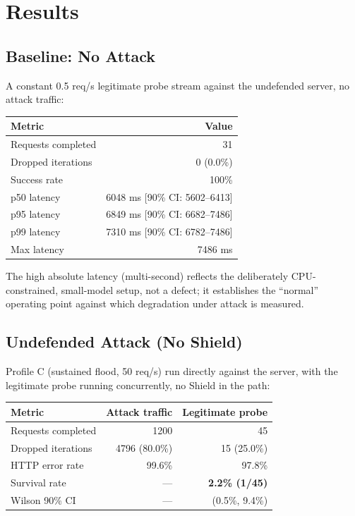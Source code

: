 \documentclass[11pt]{article}
\begin{document}
\section{Results}

\subsection{Baseline: No Attack}

A constant 0.5 req/s legitimate probe stream against the undefended server,
no attack traffic:

\begin{center}
\begin{tabular}{lr}
\toprule
Metric & Value \\
\midrule
Requests completed & 31 \\
Dropped iterations & 0 (0.0\%) \\
Success rate & 100\% \\
p50 latency & 6048 ms [90\% CI: 5602--6413] \\
p95 latency & 6849 ms [90\% CI: 6682--7486] \\
p99 latency & 7310 ms [90\% CI: 6782--7486] \\
Max latency & 7486 ms \\
\bottomrule
\end{tabular}
\end{center}

The high absolute latency (multi-second) reflects the deliberately
CPU-constrained, small-model setup, not a defect; it establishes the ``normal''
operating point against which degradation under attack is measured.

\subsection{Undefended Attack (No Shield)}

Profile C (sustained flood, 50 req/s) run directly against the server, with
the legitimate probe running concurrently, no Shield in the path:

\begin{center}
\begin{tabular}{lrr}
\toprule
Metric & Attack traffic & Legitimate probe \\
\midrule
Requests completed & 1200 & 45 \\
Dropped iterations & 4796 (80.0\%) & 15 (25.0\%) \\
HTTP error rate & 99.6\% & 97.8\% \\
Survival rate & --- & \textbf{2.2\% (1/45)} \\
Wilson 90\% CI & --- & (0.5\%, 9.4\%) \\
\bottomrule
\end{tabular}
\end{center}
\end{document}
